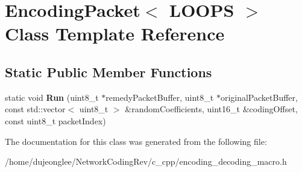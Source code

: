 \hypertarget{class_encoding_packet}{}\section{Encoding\+Packet$<$ L\+O\+O\+PS $>$ Class Template Reference}
\label{class_encoding_packet}
\subsection*{Static Public Member Functions}
\begin{DoxyCompactItemize}
\item 
static void {\bfseries Run} (uint8\+\_\+t $\ast$remedy\+Packet\+Buffer, uint8\+\_\+t $\ast$original\+Packet\+Buffer, const std\+::vector$<$ uint8\+\_\+t $>$ \&random\+Coefficients, uint16\+\_\+t \&coding\+Offset, const uint8\+\_\+t packet\+Index)\hypertarget{class_encoding_packet_a543e673d0afa8141ec064877e99d71c9}{}\label{class_encoding_packet_a543e673d0afa8141ec064877e99d71c9}

\end{DoxyCompactItemize}


The documentation for this class was generated from the following file\+:\begin{DoxyCompactItemize}
\item 
/home/dujeonglee/\+Network\+Coding\+Rev/c\+\_\+cpp/encoding\+\_\+decoding\+\_\+macro.\+h\end{DoxyCompactItemize}
